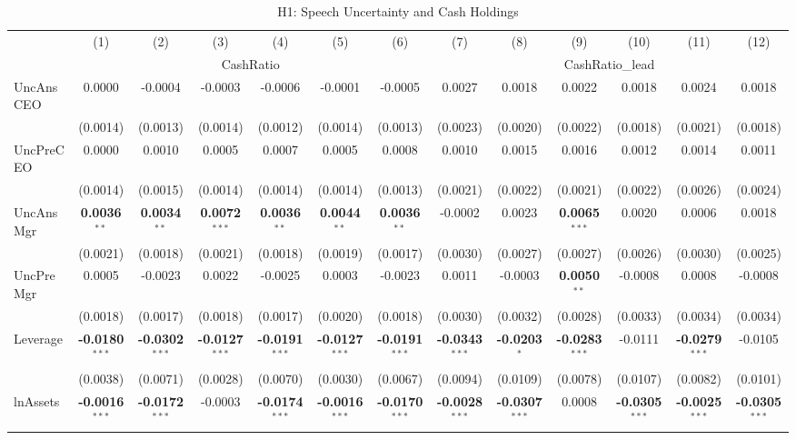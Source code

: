 \documentclass[11pt,a4paper]{article}
\begin{document}
\begin{table}[htbp]
\centering
\caption{H1: Speech Uncertainty and Cash Holdings}
\label{tab:h1}
\scriptsize
\begin{tabular}{lcccccccccccc}
\toprule
 & (1) & (2) & (3) & (4) & (5) & (6) & (7) & (8) & (9) & (10) & (11) & (12) \\
 & \multicolumn{6}{c}{CashRatio} & \multicolumn{6}{c}{CashRatio\_lead} \\
\cmidrule(lr){2-7} \cmidrule(lr){8-13}
\midrule
UncAnsCEO & 0.0000 & -0.0004 & -0.0003 & -0.0006 & -0.0001 & -0.0005 & 0.0027 & 0.0018 & 0.0022 & 0.0018 & 0.0024 & 0.0018 \\
 & (0.0014) & (0.0013) & (0.0014) & (0.0012) & (0.0014) & (0.0013) & (0.0023) & (0.0020) & (0.0022) & (0.0018) & (0.0021) & (0.0018) \\
UncPreCEO & 0.0000 & 0.0010 & 0.0005 & 0.0007 & 0.0005 & 0.0008 & 0.0010 & 0.0015 & 0.0016 & 0.0012 & 0.0014 & 0.0011 \\
 & (0.0014) & (0.0015) & (0.0014) & (0.0014) & (0.0014) & (0.0013) & (0.0021) & (0.0022) & (0.0021) & (0.0022) & (0.0026) & (0.0024) \\
UncAnsMgr & \textbf{0.0036}$^{**}$ & \textbf{0.0034}$^{**}$ & \textbf{0.0072}$^{***}$ & \textbf{0.0036}$^{**}$ & \textbf{0.0044}$^{**}$ & \textbf{0.0036}$^{**}$ & -0.0002 & 0.0023 & \textbf{0.0065}$^{***}$ & 0.0020 & 0.0006 & 0.0018 \\
 & (0.0021) & (0.0018) & (0.0021) & (0.0018) & (0.0019) & (0.0017) & (0.0030) & (0.0027) & (0.0027) & (0.0026) & (0.0030) & (0.0025) \\
UncPreMgr & 0.0005 & -0.0023 & 0.0022 & -0.0025 & 0.0003 & -0.0023 & 0.0011 & -0.0003 & \textbf{0.0050}$^{**}$ & -0.0008 & 0.0008 & -0.0008 \\
 & (0.0018) & (0.0017) & (0.0018) & (0.0017) & (0.0020) & (0.0018) & (0.0030) & (0.0032) & (0.0028) & (0.0033) & (0.0034) & (0.0034) \\
\midrule
Leverage & \textbf{-0.0180}$^{***}$ & \textbf{-0.0302}$^{***}$ & \textbf{-0.0127}$^{***}$ & \textbf{-0.0191}$^{***}$ & \textbf{-0.0127}$^{***}$ & \textbf{-0.0191}$^{***}$ & \textbf{-0.0343}$^{***}$ & \textbf{-0.0203}$^{*}$ & \textbf{-0.0283}$^{***}$ & -0.0111 & \textbf{-0.0279}$^{***}$ & -0.0105 \\
 & (0.0038) & (0.0071) & (0.0028) & (0.0070) & (0.0030) & (0.0067) & (0.0094) & (0.0109) & (0.0078) & (0.0107) & (0.0082) & (0.0101) \\
lnAssets & \textbf{-0.0016}$^{***}$ & \textbf{-0.0172}$^{***}$ & -0.0003 & \textbf{-0.0174}$^{***}$ & \textbf{-0.0016}$^{***}$ & \textbf{-0.0170}$^{***}$ & \textbf{-0.0028}$^{***}$ & \textbf{-0.0307}$^{***}$ & 0.0008 & \textbf{-0.0305}$^{***}$ & \textbf{-0.0025}$^{***}$ & \textbf{-0.0305}$^{***}$ \\

\end{tabular}
\end{table}
\end{document}
